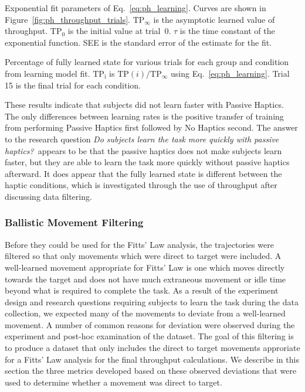 \begin{table}
    \centering
    \caption{Exponential fit parameters of Eq.~\ref{eq:ph_learning}. Curves are shown in Figure~\ref{fig:ph_throughput_trials}. $\mathrm{TP}_{\infty}$ is the asymptotic learned value of throughput. $\mathrm{TP}_0$ is the initial value at trial~0. $\tau$ is the time constant of the exponential function. SEE is the standard error of the estimate for the fit.}
    \label{tab:ph_tp_regression}
\end{table}

\begin{table}
    \centering
    \caption{Percentage of fully learned state for various trials for each group and condition from learning model fit. $\mathrm{TP_i}$ is $\mathrm{TP}(i)/\mathrm{TP}_{\infty}$ using Eq.~\ref{eq:ph_learning}. Trial 15 is the final trial for each condition.}
    \label{tab:ph_tp_regression_values}
\end{table}

These results indicate that subjects did not learn faster with Passive Haptics.
The only differences between learning rates is the positive transfer of training from performing Passive Haptics first followed by No Haptics second.
The answer to the research question \textit{Do subjects learn the task more quickly with passive haptics?}\ appears to be that the passive haptics does not make subjects learn faster, but they are able to learn the task more quickly without passive haptics afterward.
It does appear that the fully learned state is different between the haptic conditions, which is investigated through the use of throughput after discussing data filtering.

\subsubsection{Ballistic Movement Filtering}
\label{sec:ph_ballistic_filter}

Before they could be used for the Fitts' Law analysis, the trajectories were filtered so that only movements which were direct to target were included.
A well-learned movement appropriate for Fitts' Law is one which moves directly towards the target and does not have much extraneous movement or idle time beyond what is required to complete the task.
As a result of the experiment design and research questions requiring subjects to learn the task during the data collection, we expected many of the movements to deviate from a well-learned movement.
A number of common reasons for deviation were observed during the experiment and post-hoc examination of the dataset.
The goal of this filtering is to produce a dataset that only includes the direct to target movements approriate for a Fitts' Law analysis for the final throughput calculations.
We describe in this section the three metrics developed based on these observed deviations that were used to determine whether a movement was direct to target.

